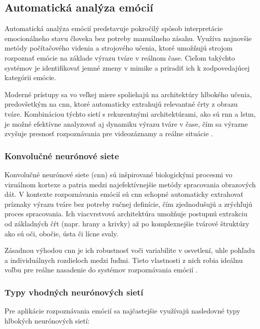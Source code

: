 \subsection{Automatická analýza emócií}

Automatická analýza emócií predstavuje pokročilý spôsob interpretácie emocionálneho stavu človeka bez potreby manuálneho zásahu. Využíva najnovšie metódy počítačového videnia a strojového učenia, ktoré umožňujú strojom rozpoznať emócie na základe výrazu tváre v reálnom čase. Cieľom takýchto systémov je identifikovať jemné zmeny v mimike a priradiť ich k zodpovedajúcej kategórii emócie.

Moderné prístupy sa vo veľkej miere spoliehajú na architektúry hlbokého učenia, predovšetkým na \gls{cnn}, ktoré automaticky extrahujú relevantné črty z obrazu tváre. Kombináciou týchto sietí s rekurentnými architektúrami, ako sú \gls{rnn} a \gls{lstm}, je možné efektívne analyzovať aj dynamiku výrazu tváre v čase, čím sa výrazne zvyšuje presnosť rozpoznávania pre videozáznamy a reálne situácie \cite{article01} \cite{misc01}.

\subsubsection{Konvolučné neurónové siete}

Konvolučné neurónové siete (\gls{cnn}) sú inšpirované biologickými procesmi vo vizuálnom kortexe a patria medzi najefektívnejšie metódy spracovania obrazových dát. V kontexte rozpoznávania emócií sú \gls{cnn} schopné automaticky extrahovať príznaky výrazu tváre bez potreby ručnej definície, čím zjednodušujú a zrýchľujú proces spracovania. Ich viacvrstvová architektúra umožňuje postupnú extrakciu od základných čŕt (napr. hrany a krivky) až po komplexnejšie tvárové štruktúry ako sú oči, obočie, ústa či lícne svaly.

Zásadnou výhodou \gls{cnn} je ich robustnosť voči variabilite v osvetlení, uhle pohľadu a individuálnych rozdieloch medzi ľuďmi. Tieto vlastnosti z nich robia ideálnu voľbu pre reálne nasadenie do systémov rozpoznávania emócií \cite{article05}.

\subsubsection{Typy vhodných neurónových sietí}

Pre aplikácie rozpoznávania emócií sa najčastejšie využívajú nasledovné typy hlbokých neurónových sietí:

